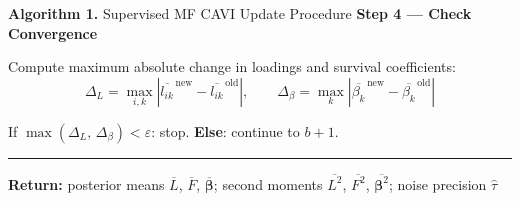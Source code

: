 \documentclass{article}[12pt]
\begin{document}
\begin{algobox}{\textbf{Algorithm 1.} Supervised MF CAVI Update Procedure}
\hspace{1em}\textbf{Step 4 --- Check Convergence}

\medskip
\hspace{2em}Compute maximum absolute change in loadings and survival coefficients:
\[
    \Delta_L = \max_{i,k}\left|\overline{l_{ik}}^{\,\text{new}} - \overline{l_{ik}}^{\,\text{old}}\right|,
    \qquad
    \Delta_\beta = \max_{k}\left|\overline{\beta_k}^{\,\text{new}} - \overline{\beta_k}^{\,\text{old}}\right|
\]

\hspace{2em}If $\max\!\left(\Delta_L,\,\Delta_\beta\right) < \varepsilon$: stop. \textbf{Else}: continue to $b+1$.

\medskip
\hrule
\medskip

\textbf{Return:} posterior means $\overline{L}$, $\overline{F}$, $\overline{\bm{\beta}}$;
second moments $\overline{L^2}$, $\overline{F^2}$, $\overline{\bm{\beta}^2}$;
noise precision $\hat{\tau}$

\end{algobox}

\end{document}
